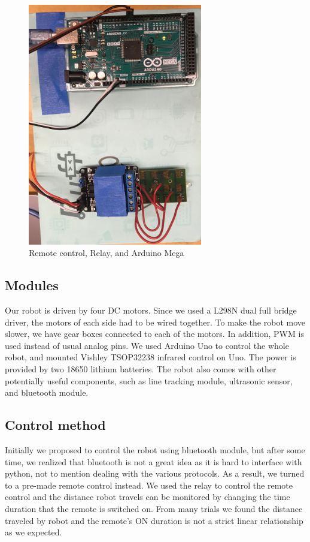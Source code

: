 \documentclass[reprint,amsmath, amsfonts, amssymb, aps, letterpaper]{revtex4-1}
\begin{document}
\begin{figure}[!htb]
\begin{center}
\includegraphics[width=3in]{relay.jpg}
\caption{Remote control, Relay, and Arduino Mega}
\label{fig1}
\end{center}
\end{figure}

\subsection{Modules}
Our robot is driven by four DC motors. Since we used a L298N dual full bridge driver, the motors of each side had to be wired together. To make the robot move slower, we have gear boxes connected to each of the motors. In addition, PWM is used instead of usual analog pins. We used Arduino Uno to control the whole robot, and mounted Vishley TSOP32238 infrared control on Uno. The power is provided by two 18650 lithium batteries. The robot also comes with other potentially useful components, such as line tracking module, ultrasonic sensor, and bluetooth module.

\subsection{Control method}
Initially we proposed to control the robot using bluetooth module, but after some time, we realized that bluetooth is not a great idea as it is hard to interface with python, not to mention dealing with the various protocols. As a result, we turned to a pre-made remote control instead. We used the relay to control the remote control and the distance robot travels can be monitored by changing the time duration that the remote is switched on. From many trials we found the distance traveled by robot and the remote's ON duration is not a strict linear relationship as we expected. 
\end{document}
